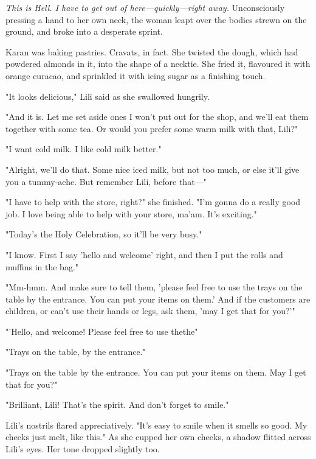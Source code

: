 \emph{This is Hell. I have to get out of here---quickly---right away.}
Unconsciously pressing a hand to her own neck, the woman leapt over the
bodies strewn on the ground, and broke into a desperate sprint.

\clearpage


Karan was baking pastries. Cravats, in fact. She twisted the dough,
which had powdered almonds in it, into the shape of a necktie. She fried
it, flavoured it with orange curacao, and sprinkled it with icing sugar
as a finishing touch.

"It looks delicious," Lili said as she swallowed hungrily.

"And it is. Let me set aside ones I won't put out for the shop, and
we'll eat them together with some tea. Or would you prefer some warm
milk with that, Lili?"

"I want cold milk. I like cold milk better."

"Alright, we'll do that. Some nice iced milk, but not too much, or else
it'll give you a tummy-ache. But remember Lili, before that---"

"I have to help with the store, right?" she finished. "I'm gonna do a
really good job. I love being able to help with your store, ma'am. It's
exciting."

"Today's the Holy Celebration, so it'll be very busy."

"I know. First I say 'hello and welcome' right, and then I put the rolls
and muffins in the bag."

"Mm-hmm. And make sure to tell them, 'please feel free to use the trays
on the table by the entrance. You can put your items on them.' And if
the customers are children, or can't use their hands or legs, ask them,
'may I get that for you?'"

"'Hello, and welcome! Please feel free to use the\el the\el "

"Trays on the table, by the entrance."

"Trays on the table by the entrance. You can put your items on them. May
I get that for you?"

"Brilliant, Lili! That's the spirit. And don't forget to smile."

Lili's nostrils flared appreciatively. "It's easy to smile when it
smells so good. My cheeks just melt, like this." As she cupped her own
cheeks, a shadow flitted across Lili's eyes. Her tone dropped slightly
too.

